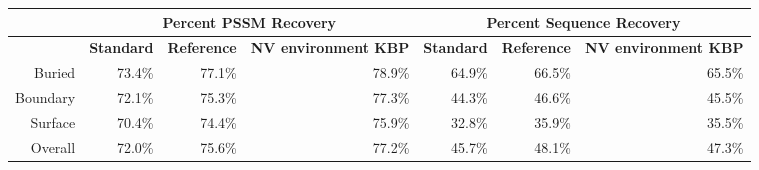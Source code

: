 \begin{tabular}{|r||r|r|r|r|r|r|}
\hline
 & \multicolumn{3}{c}{\textbf{Percent PSSM Recovery}} & \multicolumn{3}{|c|}{\textbf{Percent Sequence Recovery}}\\
\hline
  & \textbf{Standard} & \textbf{Reference} & \textbf{NV environment KBP} & \textbf{Standard} & \textbf{Reference} & \textbf{NV environment KBP}\\
\hline
\hline
Buried & 73.4\% & 77.1\% & 78.9\% & 64.9\% & 66.5\% & 65.5\% \\
\hline
Boundary & 72.1\% & 75.3\% & 77.3\% & 44.3\% & 46.6\% & 45.5\% \\
\hline
Surface & 70.4\% & 74.4\% & 75.9\% & 32.8\% & 35.9\% & 35.5\% \\
\hline
Overall & 72.0\% & 75.6\% & 77.2\% & 45.7\% & 48.1\% & 47.3\% \\
\hline
\end{tabular}